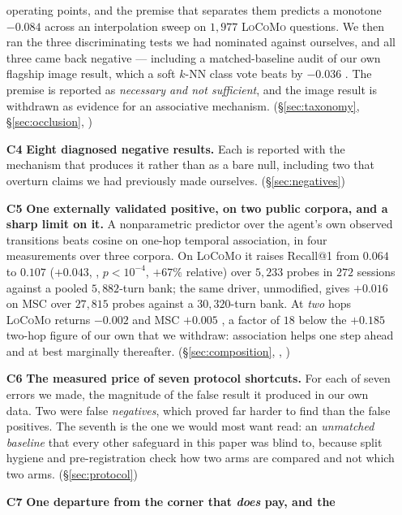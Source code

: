 \begin{itemize}
    operating points, and the premise that separates them predicts a monotone $-0.084$
    across an interpolation sweep on $1{,}977$ \textsc{LoCoMo} questions. We then ran the
    three discriminating tests we had nominated against ourselves, and all three came back
    negative --- including a matched-baseline audit of our own flagship image result, which
    a soft $k$-NN class vote beats by $-0.036$ . The premise is reported
    as \emph{necessary and not sufficient}, and the image result is withdrawn as evidence
    for an associative mechanism. (\S\ref{sec:taxonomy}, \S\ref{sec:occlusion},
    )
  \item[\textbf{C4}] \textbf{Eight diagnosed negative results.} Each is reported with the
    mechanism that produces it rather than as a bare null, including two that overturn claims
    we had previously made ourselves. (\S\ref{sec:negatives})
  \item[\textbf{C5}] \textbf{One externally validated positive, on two public corpora, and a
    sharp limit on it.} A nonparametric predictor over the agent's own observed transitions
    beats cosine on one-hop temporal association, in four measurements over three corpora.
    On \textsc{LoCoMo} it raises Recall@1 from $0.064$ to $0.107$
    ($+0.043$, , $p<10^{-4}$, $+67\%$ relative) over $5{,}233$ probes in
    $272$ sessions against a pooled $5{,}882$-turn bank; the same driver, unmodified, gives
    $+0.016$  on \textsc{MSC} over $27{,}815$ probes against a
    $30{,}320$-turn bank. At \emph{two} hops \textsc{LoCoMo} returns $-0.002$
     and \textsc{MSC} $+0.005$ , a factor of $18$
    below the $+0.185$ two-hop figure of our own that we withdraw: association helps one
    step ahead and at best marginally thereafter. (\S\ref{sec:composition}, ,
    )
  \item[\textbf{C6}] \textbf{The measured price of seven protocol shortcuts.} For each of seven
    errors we made, the magnitude of the false result it produced in our own data. Two were
    false \emph{negatives}, which proved far harder to find than the false positives. The
    seventh is the one we would most want read: an \emph{unmatched baseline} that every
    other safeguard in this paper was blind to, because split hygiene and pre-registration
    check how two arms are compared and not which two arms. (\S\ref{sec:protocol})
  \item[\textbf{C7}] \textbf{One departure from the corner that \emph{does} pay, and the
}
\end{itemize}
